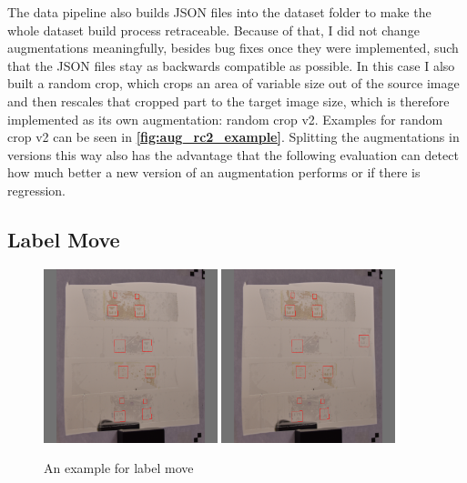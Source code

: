 \documentclass[10pt]{book}
\newcommand{\figureref}[1]{\textbf{\autoref{#1}}}
\begin{document}
The data pipeline also builds \ac{JSON} files into the dataset folder to make the whole dataset build process retraceable. Because of that, I did not change augmentations meaningfully, besides bug fixes once they were implemented, such that the \ac{JSON} files stay as backwards compatible as possible. In this case I also built a random crop, which crops an area of variable size out of the source image and then rescales that cropped part to the target image size, which is therefore implemented as its own augmentation: random crop v2. Examples for random crop v2 can be seen in \figureref{fig:aug_rc2_example}. Splitting the augmentations in versions this way also has the advantage that the following evaluation can detect how much better a new version of an augmentation performs or if there is regression.

\subsection{Label Move}

\begin{figure}
  \centering
     {\includegraphics[width=0.45\textwidth]{image/aug_lm_before}}
     {\includegraphics[width=0.45\textwidth]{image/aug_lm_after}}
  \caption{An example for label move}
  \label{fig:aug_lm_example}
\end{figure}
\end{document}
